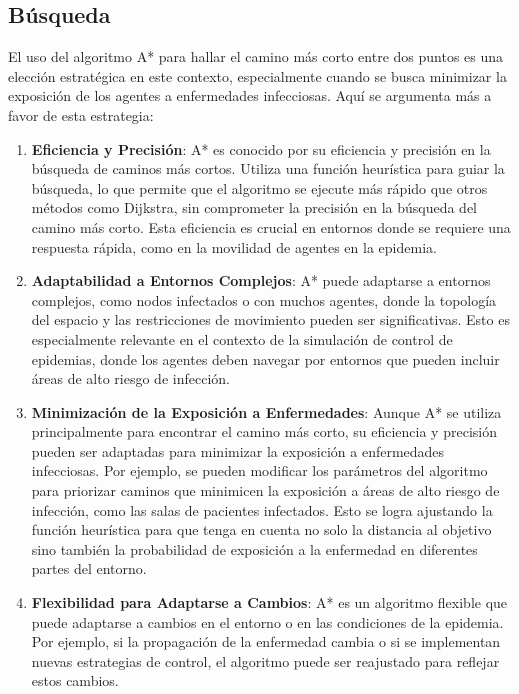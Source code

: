 \subsection{Búsqueda}
El uso del algoritmo A* para hallar el camino más corto entre dos puntos es una elección estratégica en este contexto, especialmente cuando se busca minimizar la exposición de los agentes a enfermedades infecciosas. Aquí se argumenta más a favor de esta estrategia:
\begin{enumerate}
    \item \textbf{Eficiencia y Precisión}: A* es conocido por su eficiencia y precisión en la búsqueda de caminos más cortos. Utiliza una función heurística para guiar la búsqueda, lo que permite que el algoritmo se ejecute más rápido que otros métodos como Dijkstra, sin comprometer la precisión en la búsqueda del camino más corto. Esta eficiencia es crucial en entornos donde se requiere una respuesta rápida, como en la movilidad de agentes en la epidemia.
    \item \textbf{Adaptabilidad a Entornos Complejos}: A* puede adaptarse a entornos complejos, como nodos infectados o con muchos agentes, donde la topología del espacio y las restricciones de movimiento pueden ser significativas. Esto es especialmente relevante en el contexto de la simulación de control de epidemias, donde los agentes deben navegar por entornos que pueden incluir áreas de alto riesgo de infección.
    \item \textbf{Minimización de la Exposición a Enfermedades}: Aunque A* se utiliza principalmente para encontrar el camino más corto, su eficiencia y precisión pueden ser adaptadas para minimizar la exposición a enfermedades infecciosas. Por ejemplo, se pueden modificar los parámetros del algoritmo para priorizar caminos que minimicen la exposición a áreas de alto riesgo de infección, como las salas de pacientes infectados. Esto se logra ajustando la función heurística para que tenga en cuenta no solo la distancia al objetivo sino también la probabilidad de exposición a la enfermedad en diferentes partes del entorno.
    \item \textbf{Flexibilidad para Adaptarse a Cambios}: A* es un algoritmo flexible que puede adaptarse a cambios en el entorno o en las condiciones de la epidemia. Por ejemplo, si la propagación de la enfermedad cambia o si se implementan nuevas estrategias de control, el algoritmo puede ser reajustado para reflejar estos cambios.
\end{enumerate}

